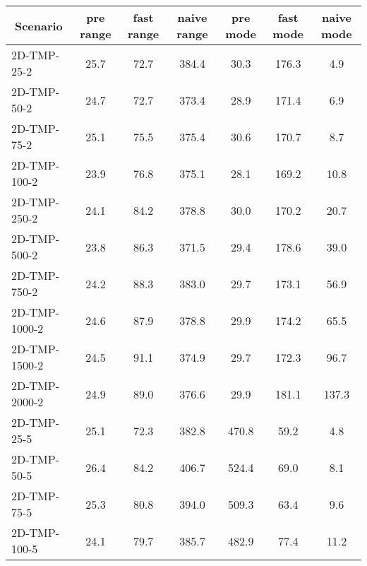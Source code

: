 \documentclass{article}
\begin{document}
    \begin{table}[h]
        \begin{center}
        \begin{tabular}{|l||c|c|c|c|c|c|}
            \hline
            \multicolumn{1}{|c|}{Scenario} & pre range & fast range & naive range & pre mode & fast mode & naive mode \\
            \hline
            \hline
            2D-TMP-25-2                    & 25.7      & 72.7       & 384.4       & 30.3     & 176.3     & 4.9        \\
            2D-TMP-50-2                    & 24.7      & 72.7       & 373.4       & 28.9     & 171.4     & 6.9        \\
            2D-TMP-75-2                    & 25.1      & 75.5       & 375.4       & 30.6     & 170.7     & 8.7        \\
            2D-TMP-100-2                   & 23.9      & 76.8       & 375.1       & 28.1     & 169.2     & 10.8       \\
            2D-TMP-250-2                   & 24.1      & 84.2       & 378.8       & 30.0     & 170.2     & 20.7       \\
            2D-TMP-500-2                   & 23.8      & 86.3       & 371.5       & 29.4     & 178.6     & 39.0       \\
            2D-TMP-750-2                   & 24.2      & 88.3       & 383.0       & 29.7     & 173.1     & 56.9       \\
            2D-TMP-1000-2                  & 24.6      & 87.9       & 378.8       & 29.9     & 174.2     & 65.5       \\
            2D-TMP-1500-2                  & 24.5      & 91.1       & 374.9       & 29.7     & 172.3     & 96.7       \\
            2D-TMP-2000-2                  & 24.9      & 89.0       & 376.6       & 29.9     & 181.1     & 137.3      \\
            \hline
            2D-TMP-25-5                    & 25.1      & 72.3       & 382.8       & 470.8    & 59.2      & 4.8        \\
            2D-TMP-50-5                    & 26.4      & 84.2       & 406.7       & 524.4    & 69.0      & 8.1        \\
            2D-TMP-75-5                    & 25.3      & 80.8       & 394.0       & 509.3    & 63.4      & 9.6        \\
            2D-TMP-100-5                   & 24.1      & 79.7       & 385.7       & 482.9    & 77.4      & 11.2       \\

\end{tabular}
\end{center}
\end{table}
\end{document}
